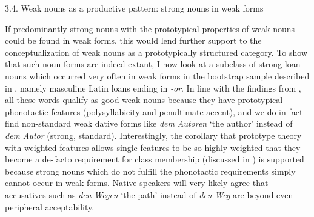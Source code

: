 \begin{styleMoutonHeadingii}
3.4. Weak nouns as a productive pattern: strong nouns in weak forms
\end{styleMoutonHeadingii}

\begin{styleMoutonText}
If predominantly strong nouns with the prototypical properties of weak nouns could be found in weak forms, this would lend further support to the conceptualization of weak nouns as a prototypically structured category. To show that such noun forms are indeed extant, I now look at a subclass of strong loan nouns which occurred very often in weak forms in the bootstrap sample described in , namely masculine Latin loans ending in \textit{\nobreakdash-or}. In line with the findings from , all these words qualify as good weak nouns because they have prototypical phonotactic features (polysyllabicity and penultimate accent), and we do in fact find non-standard weak dative forms like \textit{dem} \textit{Autoren} ‘the author’ instead of \textit{dem} \textit{Autor} (strong, standard). Interestingly, the corollary that prototype theory with weighted features allows single features to be so highly weighted that they become a de-facto requirement for class membership (discussed in ) is supported because strong nouns which do not fulfill the phonotactic requirements simply cannot occur in weak forms. Native speakers will very likely agree that accusatives such as \textit{den} \textit{Wegen} ‘the path’ instead of \textit{den} \textit{Weg} are beyond even peripheral acceptability.
\end{styleMoutonText}

\begin{styleMoutonCaption}%
\begin{table}
\caption{Counts of strong and weak occurrences of 62 strong nouns ending in \textit{\nobreakdash-or} by humanness of denotation. n~=~114,486. Considering the size of the sample, significance testing is not required. Odds ratio O(weak{\textbar}human,weak{\textbar}non-human)~=~18.868.}
\label{tab:7}
\end{table}\end{styleMoutonCaption}

\tablefirsthead{}

